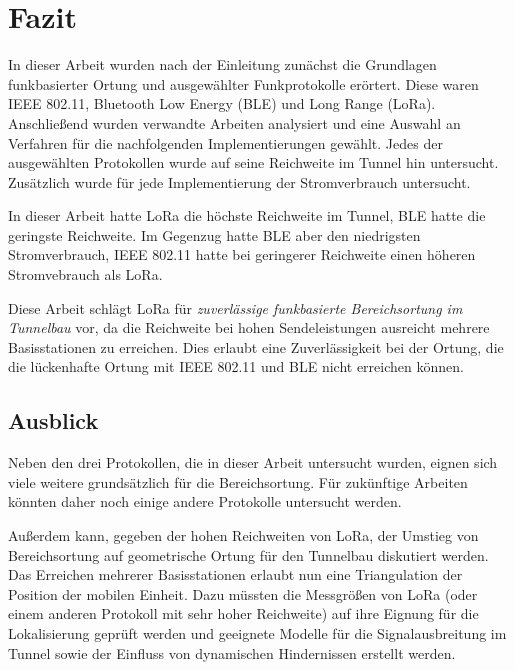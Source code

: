 \chapter{Fazit}
\label{ch:Fazit}
In dieser Arbeit wurden nach der Einleitung zunächst die Grundlagen funkbasierter Ortung und ausgewählter Funkprotokolle erörtert.
Diese waren IEEE 802.11, Bluetooth Low Energy (BLE) und Long Range (LoRa).
Anschließend wurden verwandte Arbeiten analysiert und eine Auswahl an Verfahren für die nachfolgenden Implementierungen gewählt.
Jedes der ausgewählten Protokollen wurde auf seine Reichweite im Tunnel hin untersucht.
Zusätzlich wurde für jede Implementierung der Stromverbrauch untersucht.

In dieser Arbeit hatte LoRa die höchste Reichweite im Tunnel, BLE hatte die geringste Reichweite.
Im Gegenzug hatte BLE aber den niedrigsten Stromverbrauch, IEEE 802.11 hatte bei geringerer Reichweite einen höheren Stromvebrauch als LoRa.

Diese Arbeit schlägt LoRa für \emph{zuverlässige funkbasierte Bereichsortung im Tunnelbau} vor, da die Reichweite bei hohen Sendeleistungen ausreicht mehrere Basisstationen zu erreichen.
Dies erlaubt eine Zuverlässigkeit bei der Ortung, die die lückenhafte Ortung mit IEEE 802.11 und BLE nicht erreichen können.

\section{Ausblick}
Neben den drei Protokollen, die in dieser Arbeit untersucht wurden, eignen sich viele weitere grundsätzlich für die Bereichsortung.
Für zukünftige Arbeiten könnten daher noch einige andere Protokolle untersucht werden.

Außerdem kann, gegeben der hohen Reichweiten von LoRa, der Umstieg von Bereichsortung auf geometrische Ortung für den Tunnelbau diskutiert werden.
Das Erreichen mehrerer Basisstationen erlaubt nun eine Triangulation der Position der mobilen Einheit.
Dazu müssten die Messgrößen von LoRa (oder einem anderen Protokoll mit sehr hoher Reichweite) auf ihre Eignung für die Lokalisierung geprüft werden und geeignete Modelle für die Signalausbreitung im Tunnel sowie der Einfluss von dynamischen Hindernissen erstellt werden.

